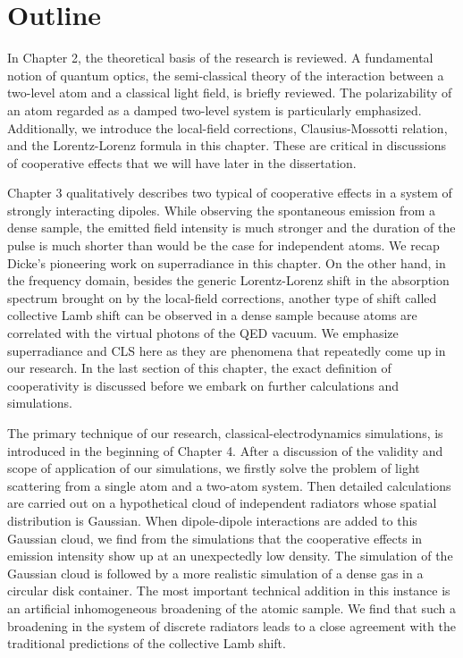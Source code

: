 \section{Outline}

In Chapter 2, the theoretical basis of the research is reviewed. A fundamental notion of quantum optics, the semi-classical theory of the interaction between a two-level atom and a classical light field, is briefly reviewed. The polarizability of an atom regarded as a damped two-level system is particularly emphasized. Additionally, we introduce the local-field corrections,  Clausius-Mossotti relation, and the Lorentz-Lorenz formula in this chapter. These are critical in discussions of cooperative effects that we will have later in the dissertation.

Chapter 3 qualitatively describes two typical of cooperative effects in a system of strongly interacting dipoles. While observing the spontaneous emission from a dense sample, the emitted field intensity is much stronger and the duration of the pulse is much shorter than would be the case for  independent atoms. We recap Dicke's pioneering work on superradiance in this chapter. On the other hand, in the frequency domain, besides the generic Lorentz-Lorenz shift  in the absorption spectrum brought on by the local-field corrections, another type of shift called collective Lamb shift can be observed in a dense sample because atoms are correlated with the virtual photons of the QED vacuum. We emphasize superradiance and CLS here as they are phenomena that repeatedly come up in our research. In the last section of this chapter, the exact definition of cooperativity is discussed before we embark on further calculations and simulations.

The primary technique of our research, classical-electrodynamics simulations, is introduced in the beginning of Chapter 4. After a discussion of the validity and scope of application of our simulations, we firstly solve the problem of light scattering from a single atom and a two-atom system. Then detailed calculations are carried out on a hypothetical cloud of independent radiators whose spatial distribution is Gaussian.  When dipole-dipole interactions are added to this Gaussian cloud, we find from the simulations that the cooperative effects in emission intensity show up at an unexpectedly low density. The simulation of the Gaussian cloud is followed by a more realistic simulation of a dense gas in a circular disk container. The most important technical addition in this instance is an artificial inhomogeneous broadening of the atomic sample. We find that such a broadening in the system of discrete radiators leads to a close agreement with the traditional predictions of the collective Lamb shift.

